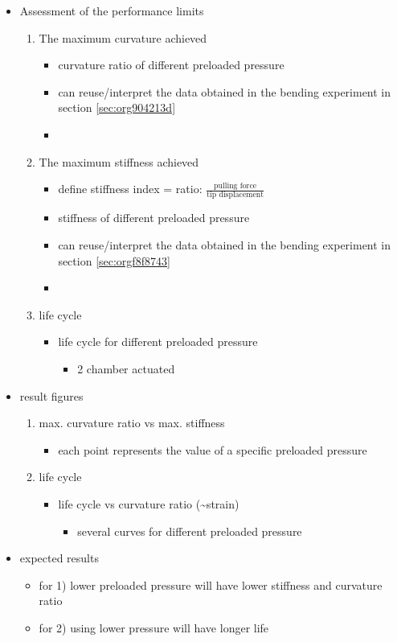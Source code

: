 \documentclass[journal,onecolumn]{IEEEtran}
\begin{document}
\begin{itemize}
\item Assessment of the performance limits
\begin{enumerate}
\item The maximum curvature achieved
\begin{itemize}
\item curvature ratio of different preloaded pressure
\item can reuse/interpret the data obtained in the bending experiment in section \ref{sec:org904213d}
\item 
\end{itemize}
\item The maximum stiffness achieved
\begin{itemize}
\item define stiffness index = ratio: \(\frac{\textrm{pulling force}}{\textrm{tip displacement}}\)
\item stiffness of different preloaded pressure
\item can reuse/interpret the data obtained in the bending experiment in section \ref{sec:orgf8f8743}
\item 
\end{itemize}
\item life cycle 
\begin{itemize}
\item life cycle for different preloaded pressure
\begin{itemize}
\item 2 chamber actuated
\end{itemize}
\end{itemize}
\end{enumerate}
\item result figures
\begin{enumerate}
\item max. curvature ratio vs max. stiffness
\begin{itemize}
\item each point represents the value of a specific preloaded pressure
\end{itemize}
\item life cycle
\begin{itemize}
\item life cycle vs curvature ratio (\textasciitilde{}strain)
\begin{itemize}
\item several curves for different preloaded pressure
\end{itemize}
\end{itemize}
\end{enumerate}
\item expected results
\begin{itemize}
\item for 1) lower preloaded pressure will have lower stiffness and curvature ratio
\item for 2) using lower pressure will have longer life
\end{itemize}
\end{itemize}
\end{document}
